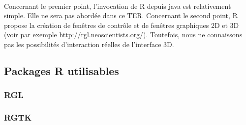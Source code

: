 \paragraph{}
Concernant le premier point, l'invocation de R depuis java est relativement simple. Elle ne sera pas
abordée dans ce TER. Concernant le second point, R propose la création de fenêtres de contrôle et
de fenêtres graphiques 2D et 3D (voir par exemple http://rgl.neoscientists.org/). Toutefois, nous ne
connaissons pas les possibilités d'interaction réelles de l'interface 3D.
%

\newpage
\subsection{Packages R utilisables}
\subsubsection{RGL}

\subsubsection{RGTK}

\newpage
